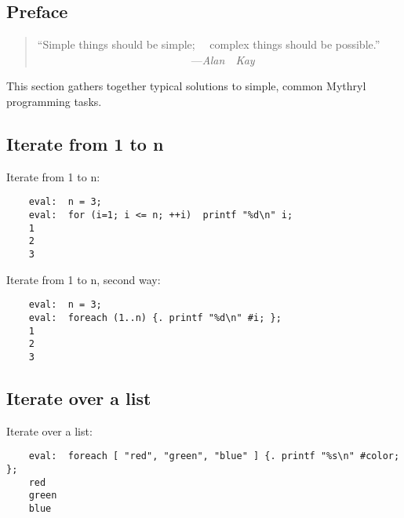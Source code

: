 \label{section:tut:recipes}

\subsection{Preface}
\label{section:tut:recipes:preface}

\begin{quote}\begin{tiny}
       ``Simple things should be simple;\newline
         ~~complex things should be possible.''\newline
         ~~~~~~~~~~~~~~~~~~~~~~~~~~~~---{\em Alan~~Kay}
\end{tiny}\end{quote}

This section gathers together typical solutions to simple, common Mythryl programming tasks.
\cutend*

\subsection{Iterate from 1 to n}

Iterate from 1 to n:
\begin{verbatim}
    eval:  n = 3;
    eval:  for (i=1; i <= n; ++i)  printf "%d\n" i;
    1
    2
    3
\end{verbatim}

Iterate from 1 to n, second way:
\begin{verbatim}
    eval:  n = 3;
    eval:  foreach (1..n) {. printf "%d\n" #i; };
    1
    2
    3
\end{verbatim}

\cutend*

\subsection{Iterate over a list}

Iterate over a list:
\begin{verbatim}
    eval:  foreach [ "red", "green", "blue" ] {. printf "%s\n" #color; };
    red
    green
    blue
\end{verbatim}


